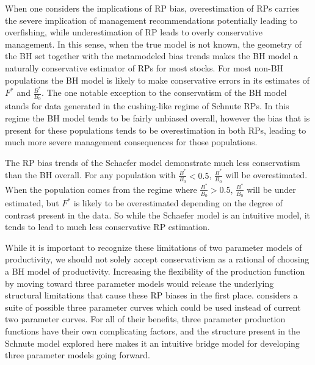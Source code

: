 \documentclass[12pt]{article}
\begin{document}
%
When one considers the implications of RP bias, overestimation of RPs carries 
the severe implication of management recommendations potentially leading to 
overfishing, while underestimation of RP leads to overly conservative management.
In this sense, when the true model is not known, the geometry of the BH set together 
with the metamodeled bias trends makes the BH model a naturally conservative 
estimator of RPs for most stocks. For most non-BH populations the BH model is 
likely to make conservative errors in its estimates of $F^*$ and $\frac{B^*}{B_0}$. 
The one notable exception to the conservatism of the BH model stands for data 
generated in the cushing-like regime of Schnute RPs. In this regime the BH 
model tends to be fairly unbiased overall, however the bias that is present 
for these populations tends to be overestimation in both RPs, leading to much 
more severe management consequences for those populations.

%
The RP bias trends of the Schaefer model demonstrate much less conservatism than the BH overall.
For any population with $\frac{B^*}{B_0}<0.5$, $\frac{B^*}{B_0}$ will be overestimated. 
When the population comes from the regime where $\frac{B^*}{B_0}>0.5$, $\frac{B^*}{B_0}$ 
will be under estimated, but $F^*$ is likely to be overestimated depending on the degree of 
contrast present in the data. So while the Schaefer model is an intuitive model, it tends to 
lead to much less conservative RP estimation. 

%
While it is important to recognize these limitations of two parameter models 
of productivity, we should not solely accept conservativism as a rational of 
choosing a BH model of productivity. %
Increasing the flexibility of the production function by moving toward 
three parameter models would release the underlying structural limitations 
 that cause these RP biases in the first place. 
considers a suite of possible three parameter curves which could be used 
instead of current two parameter curves. For all of their benefits, three 
parameter production functions have their own complicating factors, and the 
structure present in the Schnute model explored here makes it an intuitive bridge 
model for developing three parameter models going forward.
\end{document}
